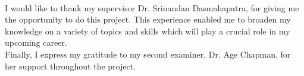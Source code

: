 

\begin{acknowledgements}
\\
I would like to thank my supervisor Dr. Srinandan Dasmahapatra, for giving me the opportunity to do this project. This experience enabled me to broaden my knowledge on a variety of topics and skills which will play a crucial role in my upcoming career. \\

Finally, I express my gratitude to my second examiner, Dr. Age Chapman, for her support throughout the project. 

\end{acknowledgements}
